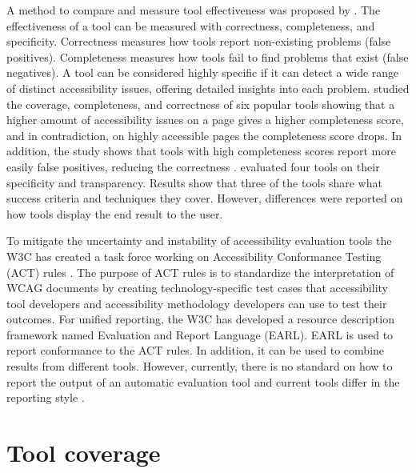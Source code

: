 A method to compare and measure tool effectiveness was proposed by \textcite{Brajnik2004}. The effectiveness of a tool can be measured with correctness, completeness, and specificity. Correctness measures how tools report non-existing problems (false positives). Completeness measures how tools fail to find problems that exist (false negatives). A tool can be considered highly specific if it can detect a wide range of distinct accessibility issues, offering detailed insights into each problem. \textcite{benchmark_aet} studied the coverage, completeness, and correctness of six popular tools showing that a higher amount of accessibility issues on a page gives a higher completeness score, and in contradiction, on highly accessible pages the completeness score drops. In addition, the study shows that tools with high completeness scores report more easily false positives, reducing the correctness \citep{benchmark_aet}. \textcite{tooltransparency} evaluated four tools on their specificity and transparency. Results show that three of the tools share what success criteria and techniques they cover. However, differences were reported on how tools display the end result to the user.

To mitigate the uncertainty and instability of accessibility evaluation tools the W3C has created a task force working on Accessibility Conformance Testing (ACT) rules \citep{act_overview}. The purpose of ACT rules is to standardize the interpretation of WCAG documents by creating technology-specific test cases that accessibility tool developers and accessibility methodology developers can use to test their outcomes. For unified reporting, the W3C has developed a resource description framework named Evaluation and Report Language (EARL). EARL is used to report conformance to the ACT rules. In addition, it can be used to combine results from different tools. However, currently, there is no standard on how to report the output of an automatic evaluation tool and current tools differ in the reporting style \citep{tool_analysis_directive}.

\section{Tool coverage\label{coverage}}

